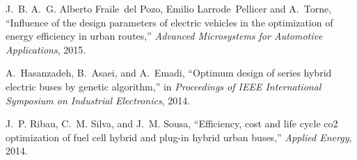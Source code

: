J.~B. A.~G. Alberto Fraile~del Pozo, Emilio Larrode~Pellicer and A.~Torne,
  ``Influence of the design parameters of electric vehicles in the optimization
  of energy efficiency in urban routes,'' {\em Advanced Microsystems for
  Automotive Applications}, 2015.

A.~Hasanzadeh, B.~Asaei, and A.~Emadi, ``Optimum design of series hybrid
  electric buses by genetic algorithm,'' in {\em Proceedings of IEEE
  International Symposium on Industrial Electronics}, 2014.

J.~P. Ribau, C.~M. Silva, and J.~M. Sousa, ``Efficiency, cost and life cycle
  co2 optimization of fuel cell hybrid and plug-in hybrid urban buses,'' {\em
  Applied Energy}, 2014.

